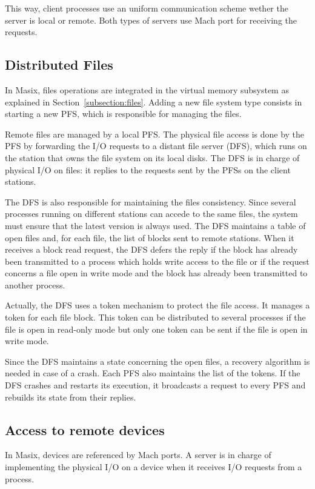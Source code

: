 	This way, client processes use an uniform communication scheme
wether the server is local or remote. Both types of servers use Mach
port for receiving the requests.

\subsection {Distributed Files}

	In Masix, files operations are integrated in the virtual memory
subsystem as explained in Section~\ref {subsection:files}. Adding a new file
system type consists in starting a new PFS, which is responsible for
managing the files.

	Remote files are managed by a local PFS. The physical file access is
done by the PFS by forwarding the I/O requests to a distant file server (DFS),
which runs on the station that owns the file system on its local disks. The
DFS is in charge of physical I/O on files: it replies to the requests sent
by the PFSs on the client stations.

	The DFS is also responsible for maintaining the files consistency.
Since several processes running on different stations can accede to the same
files, the system must ensure that the latest version is always used. The DFS
maintains a table of open files and, for each file, the list of blocks sent
to remote stations. When it receives a block read request, the DFS defers
the reply if the block has already been transmitted to a process which holds
write access to the file or if the request concerns a file open in write mode
and the block has already been transmitted to another process.

	Actually, the DFS uses a token mechanism to protect the file access. It
manages a token for each file block. This token can be distributed to
several processes if the file is open in read-only mode but only one
token can be sent if the file is open in write mode.

	Since the DFS maintains a state concerning the open files, a recovery
algorithm is needed in case of a crash. Each PFS also maintains the list of
the tokens. If the DFS crashes and restarts its execution, it broadcasts a
request to every PFS and rebuilds its state from their replies.

\subsection {Access to remote devices}

	In Masix, devices are referenced by Mach ports. A server is in charge
of implementing the physical I/O on a device when it receives I/O requests
from a process.

